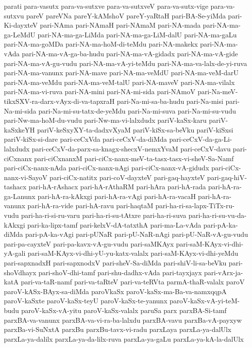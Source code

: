{parati
para-vasutx
para-va-sutxve
para-va-sutxveV
para-va-sutx-vige
para-va-sutxvu
pareV
pareVNa
pareY-kAMshoV
pareY-yaRtaH
pari-BA-Se-yiMda
pari-Ki-dayxteV
pari-NAma
pari-NAmaH
pari-NAmaM
pari-NA-mada
pari-NA-ma-ga-LeMdU
pari-NA-ma-ga-LiMda
pari-NA-ma-ga-LiM-dalU
pari-NA-ma-gaLu
pari-NA-ma-goMDa
pari-NA-ma-hoM-di-teMdu
pari-NA-makekx
pari-NA-ma-vAda
pari-NA-ma-vA-ga-ba-hudu
pari-NA-ma-vA-gidadx
pari-NA-ma-vA-gide
pari-NA-ma-vA-gu-vudu
pari-NA-ma-vA-yi-teMdu
pari-NA-ma-va-lalx-de-yi-ruva
pari-NA-ma-vanunx
pari-NA-mave
pari-NA-ma-veMdU
pari-NA-ma-veM-darU
pari-NA-ma-veMdu
pari-NA-ma-veM-talU
pari-NA-maveV
pari-NA-ma-vilalx
pari-NA-ma-vi-ruva
pari-NA-mini
pari-NA-mi-sida
pari-NAmoV
pari-Na-meV-tikxSXV-ra-darx-vAyx-di-va-tapxraH
pari-Na-mi-sa-ba-hudu
pari-Na-misi
pari-Na-mi-sida
pari-Na-mi-su-tatx-de-yeMdu
pari-Na-mi-suva
pari-Na-mi-su-vudu
pari-Nw-ma-hoM-du-vudu
pari-Nw-ma-vi-lalxdudx
pariV-kaSx-karu
pariV-kaSxkeYH
pariV-keSxyXY-ta-dadxvXyaM
pariV-kiSx-sa-beVku
pariV-kiSxsi
pariV-kiSx-si-dare
pari-ceCxVda
pari-ceCxV-da-diMda
pari-ceCxV-da-ga-Li-lalxdudx
pari-ceCxV-da-parx-sa-knagx-shecxV-nemxYvaM
pari-ceCxV-davu
pari-ciCxnanx
pari-ciCxnanxM
pari-ciCx-nanx-meV-ta-tasx-tasx-vi-sheV-Sa-Namf
pari-ciCx-nanx-nAda
pari-ciCx-nanx-nAgi
pari-ciCx-nanx-vA-gidudx
pari-ciCx-nanx-vi-SayoV
pari-ciCx-natitx
pari-coV-dayxteV
pari-gaq-hayxteV
pari-gaq-hiV-tashacx
pari-hA-rAshacx
pari-hA-rAthaRM
pari-hAra
pari-hA-rada
pari-hA-ra-ga-Lanunx
pari-hA-ra-kAkxgi
pari-hA-ra-vAgi
pari-hA-ra-vacaH
pari-hA-ra-vanunx
pari-hA-ra-vide
pari-hA-ravu
pari-haqtaM
pari-ha-ri-sa-lapx-TiTx-ru-vudu
pari-ha-ri-si-ru-varu
pari-ha-ri-su-tAtxre
pari-ha-ri-suva
pari-ha-ri-su-vu-da-kAkxgi
pari-ka-lipx-tamf
pari-kelxV-dA-tatxthA
pari-ma-La-vAda
pari-pA-ka-diMda
pari-pA-ka-vAgi
pari-pUNaR
pari-pU-NaR-nAgi
pari-pU-NaR-vA-gu-vudu
pari-pa-cayxteV
pari-pa-kavx-vA-gu-vudu
pari-saMKAyx
pari-saM-KAyx-vi-dhi-yA-gali
pari-saM-KAyx-vi-dhi-yU-yu-katx-valalx
pari-saM-KAyx-vi-dhi-yeMdu
pari-sapxnadxH
pari-sapxnodxV
pari-sheV-Sa-diMda
pari-shiV-li-sa-beVku
pari-shoVdhayx
pari-shoV-dhi-tamf
pari-shu-dadhx-vAda
pari-tayxjayx
pari-vArx-ja-katA
pari-va-taR-namf
pari-va-taRteV
pari-va-teRVta
parmA-thaR-valalx
paroV
paroV-kASx-BAyx-sa-diMda
paroVkaSx
paroV-kaSx-ma-Ba-va-namxqqpA
paroV-kaSxte
paroV-kaSx-teyU
paroV-kaSx-te-yanunx
paroV-kaSx-vA-yi-teM-budu
paroV-kaSx-vA-yitu
paroV-kaSx-valalx
paruSa
parx
parxBA-Si-tamf
parxBA-va-vanunx
parxBA-va-vi-ra-ba-lalxdu
parxBA-vavu
parxBa-vA-payxyw
parxBa-vi-SuNxtA
parxBu
parxBu-tavx-vi-radu
parxLaya
parxLa-ya-dalUlx
parxLa-ya-dalilx
parxLa-ya-da-lilx-ruva
parxLa-ya-gaLu
parxLa-ya-kA-la-dalUlx
}
